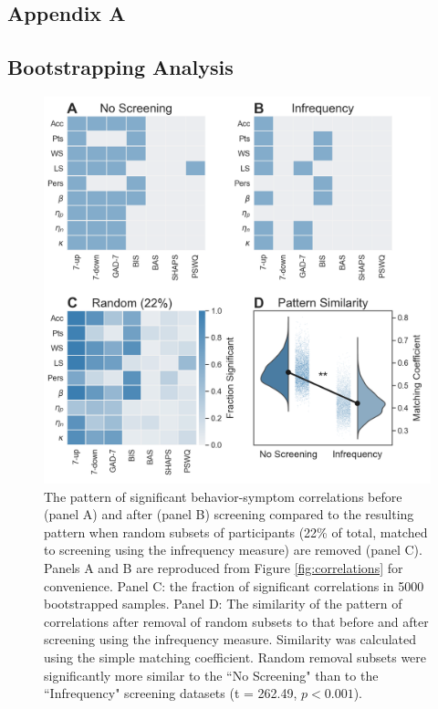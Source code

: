 \documentclass[a4paper,notitlepage,12pt]{article}
\begin{document}
\begin{refsection}[supp]
\section*{Appendix A}
\setcounter{figure}{0}
\setcounter{table}{0}
\renewcommand{\thetable}{S\arabic{table}}
\renewcommand{\thefigure}{S\arabic{figure}}

\subsection*{Bootstrapping Analysis}
\begin{figure}[H]
\includegraphics[width=16cm]{../figures/supp_01.png}
\centering
\captionsetup{width=0.88\textwidth}
\caption{The pattern of significant behavior-symptom correlations before (panel A) and after (panel B) screening compared to the resulting pattern when random subsets of participants (22\% of total, matched to screening using the infrequency measure) are removed (panel C). Panels A and B are reproduced from Figure \ref{fig:correlations} for convenience. Panel C: the fraction of significant correlations in 5000 bootstrapped samples. Panel D: The similarity of the pattern of correlations after removal of random subsets to that before and after screening using the infrequency measure. Similarity was calculated using the simple matching coefficient. Random removal subsets were significantly more similar to the ``No Screening" than to the ``Infrequency" screening datasets (t = 262.49, $p < 0.001$).}
\label{fig:random}
\end{figure}


\end{refsection}
\end{document}
